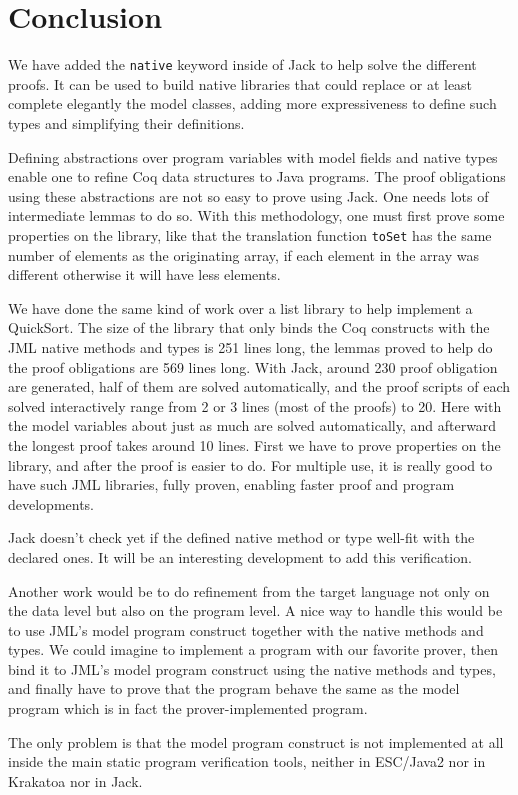 \section{Conclusion}
We have added the {\tt native} keyword inside of Jack to help solve the different 
proofs. It can be used to build  native libraries that could replace or 
at least complete elegantly the model classes, adding more expressiveness
to define such types and  simplifying their definitions.

Defining abstractions over program variables with model fields and native types
 enable one to refine Coq data structures to Java programs. 
The proof obligations using these abstractions are not so easy to prove using Jack. 
One needs lots of intermediate lemmas to do so. 
With this methodology, one must first prove some properties on the library, 
like that the translation function {\tt toSet} has the same number 
of elements as the originating array, if each element in the array
was different otherwise it will have less elements.

We have done the same kind of work over a list library to help implement a QuickSort. The size of the 
library that only binds the Coq constructs with the JML native methods and types is 251 lines long,
the lemmas proved to help do the proof obligations are 569 lines long. 
With Jack, around 230 proof obligation are generated, half of them are solved automatically, 
and the proof scripts of each solved interactively range from 2 or 3 lines (most of the proofs) to 20. 
Here with the model
variables about just as much are solved automatically, and afterward the longest proof takes around 
10 lines.
First we have to prove properties on the library, and after the proof is easier to do. 
For multiple use,
it is really good to have such JML libraries, fully proven, enabling faster proof and program developments.

Jack doesn't check yet if the defined native method or type well-fit with the declared ones.
It will be an interesting development to add this verification.


Another work would be to do  refinement from the 
target language not only on the data level but also on the program
level. A nice way to handle this would be to use JML's model program construct
together with the native methods and types. We could imagine 
to implement a program with our favorite prover, then bind it
to JML's model program construct using the native methods and types,
 and finally have to prove that the program behave the same
as the model program which is in fact the prover-implemented program.

The only problem is that the model program construct is not implemented at
all inside the main static program verification tools, neither in ESC/Java2 nor
 in Krakatoa nor in Jack. 




